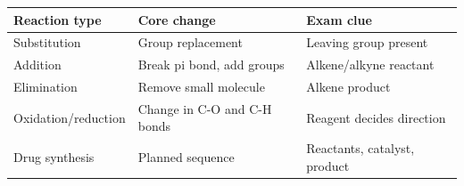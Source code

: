 \documentclass[12pt,a4paper]{article}
\renewcommand{\arraystretch}{1.45}
\begin{document}
\begin{tcolorbox}[tikzbox, title={Summary Reference Table}]
{\setlength{\tabcolsep}{4pt}\renewcommand{\arraystretch}{1.55}%
\begin{tabularx}{\linewidth}{|B{4.1cm}|Y|Y|}
\hline
\textbf{Reaction type} & \textbf{Core change} & \textbf{Exam clue} \\
\hline
Substitution & Group replacement & Leaving group present \\
\hline
Addition & Break pi bond, add groups & Alkene/alkyne reactant \\
\hline
Elimination & Remove small molecule & Alkene product \\
\hline
Oxidation/reduction & Change in C-O and C-H bonds & Reagent decides direction \\
\hline
Drug synthesis & Planned sequence & Reactants, catalyst, product \\
\hline
\end{tabularx}}
\end{tcolorbox}
\end{document}
